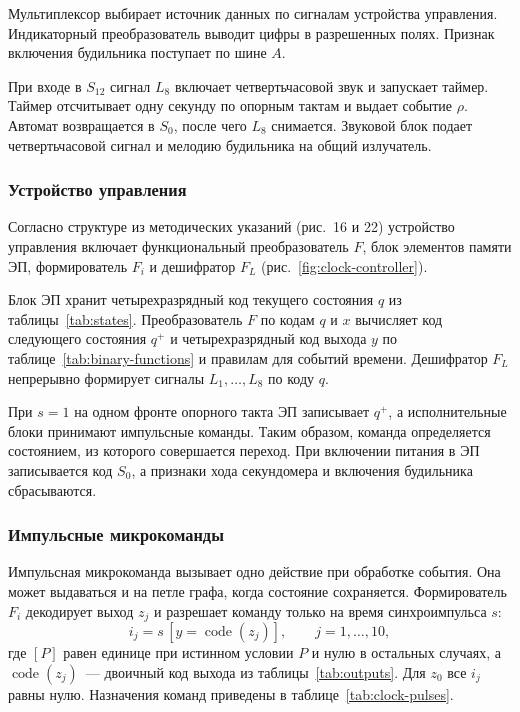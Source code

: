 Мультиплексор выбирает источник данных по сигналам устройства управления. Индикаторный преобразователь выводит цифры в разрешенных полях. Признак включения будильника поступает по шине $A$.

При входе в $S_{12}$ сигнал $L_8$ включает четвертьчасовой звук и запускает таймер. Таймер отсчитывает одну секунду по опорным тактам и выдает событие $\rho$. Автомат возвращается в $S_0$, после чего $L_8$ снимается. Звуковой блок подает четвертьчасовой сигнал и мелодию будильника на общий излучатель.

\newpage
\subsubsection{Устройство управления}
\label{sec:clock-unit}

Согласно структуре из методических указаний (рис.~16 и 22) устройство управления включает функциональный преобразователь $F$, блок элементов памяти ЭП, формирователь $F_i$ и дешифратор $F_L$ (рис.~\ref{fig:clock-controller}).



Блок ЭП хранит четырехразрядный код текущего состояния $q$ из таблицы~\ref{tab:states}. Преобразователь $F$ по кодам $q$ и $x$ вычисляет код следующего состояния $q^+$ и четырехразрядный код выхода $y$ по таблице~\ref{tab:binary-functions} и правилам для событий времени. Дешифратор $F_L$ непрерывно формирует сигналы $L_1,\ldots,L_8$ по коду $q$.

При $s=1$ на одном фронте опорного такта ЭП записывает $q^+$, а исполнительные блоки принимают импульсные команды. Таким образом, команда определяется состоянием, из которого совершается переход. При включении питания в ЭП записывается код $S_0$, а признаки хода секундомера и включения будильника сбрасываются.

\newpage
\subsubsection{Импульсные микрокоманды}
\label{sec:clock-pulses}

Импульсная микрокоманда вызывает одно действие при обработке события. Она может выдаваться и на петле графа, когда состояние сохраняется. Формирователь $F_i$ декодирует выход $z_j$ и разрешает команду только на время синхроимпульса $s$:
\[
	i_j = s\,[y=\operatorname{code}(z_j)], \qquad j=1,\ldots,10,
\]
где $[P]$ равен единице при истинном условии $P$ и нулю в остальных случаях, а $\operatorname{code}(z_j)$~--- двоичный код выхода из таблицы~\ref{tab:outputs}. Для $z_0$ все $i_j$ равны нулю. Назначения команд приведены в таблице~\ref{tab:clock-pulses}.

